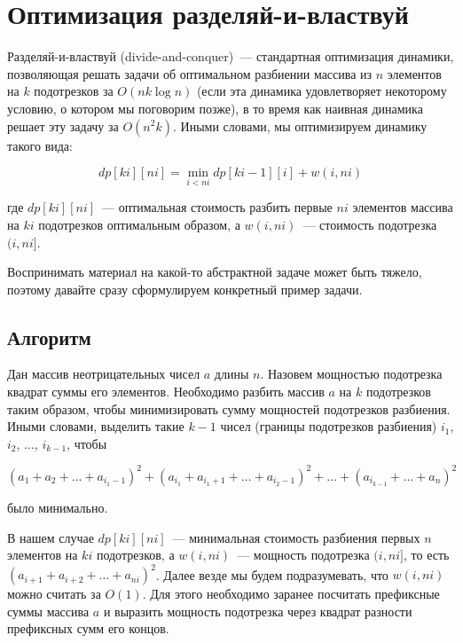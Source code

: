 \chapter{Оптимизация разделяй-и-властвуй} \label{divide-and-conquer-optimization}

Разделяй-и-властвуй (divide-and-conquer)~--- стандартная оптимизация динамики, позволяющая решать задачи об оптимальном разбиении массива из $n$ элементов на $k$ подотрезков за $O(n k \log n)$ (если эта динамика удовлетворяет некоторому условию, о котором мы поговорим позже), в то время как наивная динамика решает эту задачу за $O(n^2 k)$. Иными словами, мы оптимизируем динамику такого вида:

$$dp[ki][ni] = \min_{i < ni} dp[ki - 1][i] + w(i, ni)$$

где $dp[ki][ni]$~--- оптимальная стоимость разбить первые $ni$ элементов массива на $ki$ подотрезков оптимальным образом, а $w(i, ni)$~--- стоимость подотрезка $(i, ni]$.

Воспринимать материал на какой-то абстрактной задаче может быть тяжело, поэтому давайте сразу сформулируем конкретный пример задачи.

\section{Алгоритм}

\begin{problem}
    Дан массив неотрицательных чисел $a$ длины $n$. Назовем мощностью подотрезка квадрат суммы его элементов. Необходимо разбить массив $a$ на $k$ подотрезков таким образом, чтобы минимизировать сумму мощностей подотрезков разбиения. Иными словами, выделить такие $k - 1$ чисел (границы подотрезков разбиения) $i_1$, $i_2$, $\ldots$, $i_{k - 1}$, чтобы

    $$(a_1 + a_2 + \ldots + a_{i_1 - 1})^2 + (a_{i_1} + a_{i_1 + 1} + \ldots + a_{i_2 - 1})^2 + \ldots + (a_{i_{k - 1}} + \ldots + a_{n})^2$$

было минимально.
\end{problem}

В нашем случае $dp[ki][ni]$~--- минимальная стоимость разбиения первых $n$ элементов на $ki$ подотрезков, а $w(i, ni)$~--- мощность подотрезка $(i, ni]$, то есть $(a_{i + 1} + a_{i + 2} + \ldots + a_{ni})^2$. Далее везде мы будем подразумевать, что $w(i, ni)$ можно считать за $O(1)$. Для этого необходимо заранее посчитать префиксные суммы массива $a$ и выразить мощность подотрезка через квадрат разности префиксных сумм его концов.

